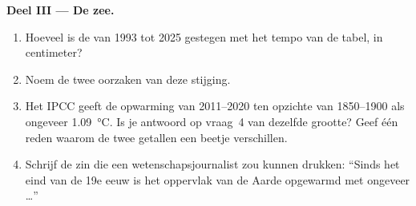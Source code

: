 \begin{problem}
\noindent\textbf{Deel III --- De zee.}\par\nopagebreak
\begin{enumerate}[resume, beginpenalty=10000]
  \item Hoeveel is de  van 1993 tot 2025 gestegen met het tempo van de
        tabel, in centimeter?
  \item Noem de twee oorzaken van deze stijging.
  \item Het IPCC geeft de opwarming van 2011--2020 ten opzichte van
        1850--1900 als ongeveer \qty{1.09}{\degreeCelsius}. Is je antwoord
        op vraag~4 van dezelfde grootte? Geef één reden waarom de twee
        getallen een beetje verschillen.
  \item Schrijf de zin die een wetenschapsjournalist zou kunnen drukken:
        ``Sinds het eind van de 19e eeuw is het oppervlak van de Aarde
        opgewarmd met ongeveer \ldots''
\end{enumerate}
\end{problem}
